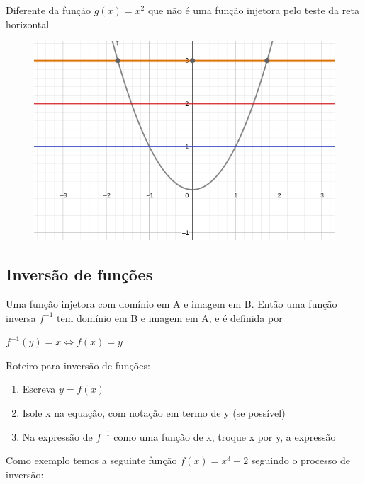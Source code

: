 \begin{multicols*}{2}
             Diferente da função $g(x) = x^2$ que não é uma função injetora pelo teste da reta horizontal
             
             \begin{figure}[H]
                    \includegraphics[scale=0.3]{assets/rafael/img38.png}
            \end{figure}
            
            \subsection*{Inversão de funções}
            \begin{theorem}
            Uma função injetora com domínio em A e imagem em B. Então uma função inversa $f^{-1}$ tem 				domínio em B e imagem em A, e é definida por
            
            $f^{-1}(y) = x \Leftrightarrow f(x) = y$
            \end{theorem}
            
            Roteiro para inversão de funções:
            
            \begin{enumerate}
            \item Escreva $y = f(x)$
            \item Isole x na equação, com notação em termo de y (se possível)
            \item Na expressão de $f^{-1}$ como uma função de x, troque x por y, a expressão 
            \end{enumerate}
            
            Como exemplo temos a seguinte função  $f(x) = x^3 +2$ seguindo o processo de 					inversão:
            

\end{multicols*}
